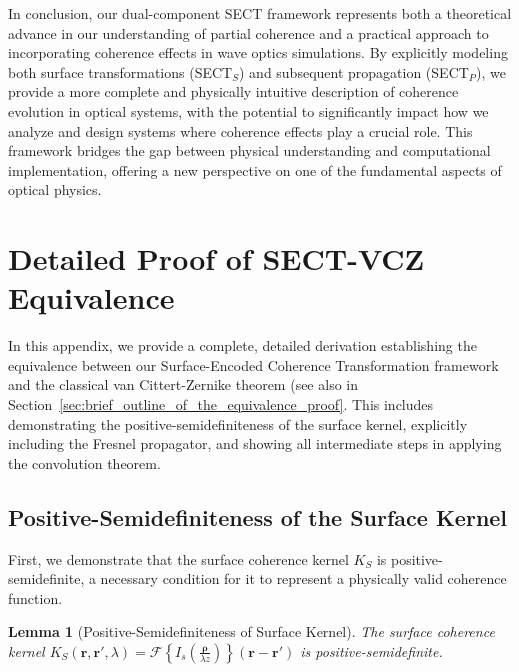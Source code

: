 \documentclass[a4paper,12pt]{article}
\newtheorem{lemma}[theorem]{Lemma}
\begin{document}
In conclusion, our dual-component SECT framework represents both a theoretical advance in our understanding of partial coherence and a practical approach to incorporating coherence effects in wave optics simulations. By explicitly modeling both surface transformations (SECT$_S$) and subsequent propagation (SECT$_P$), we provide a more complete and physically intuitive description of coherence evolution in optical systems, with the potential to significantly impact how we analyze and design systems where coherence effects play a crucial role. This framework bridges the gap between physical understanding and computational implementation, offering a new perspective on one of the fundamental aspects of optical physics.

\newpage

\appendix

\section{Detailed Proof of SECT-VCZ Equivalence}\label{sup:SECT-VCZ}

In this appendix, we provide a complete, detailed derivation establishing the equivalence between our Surface-Encoded 
Coherence Transformation framework and the classical van Cittert-Zernike theorem (see also in 
Section~\ref{sec:brief_outline_of_the_equivalence_proof}. 
This includes demonstrating the 
positive-semidefiniteness of the surface kernel, explicitly including the Fresnel propagator, and showing all intermediate 
steps in applying the convolution theorem.

\subsection{Positive-Semidefiniteness of the Surface Kernel}

First, we demonstrate that the surface coherence kernel $K_S$ is positive-semidefinite, a necessary condition for it to 
represent a physically valid coherence function.

\begin{lemma}[Positive-Semidefiniteness of Surface Kernel]
The surface coherence kernel 
$K_S(\mathbf{r}, \mathbf{r}', \lambda) = \mathcal{F}\left\{I_s\left(\frac{\mathbf{\rho}}{\lambda z}\right)\right\}(\mathbf{r} - \mathbf{r}')$ 
is positive-semidefinite.
\end{lemma}
\end{document}
